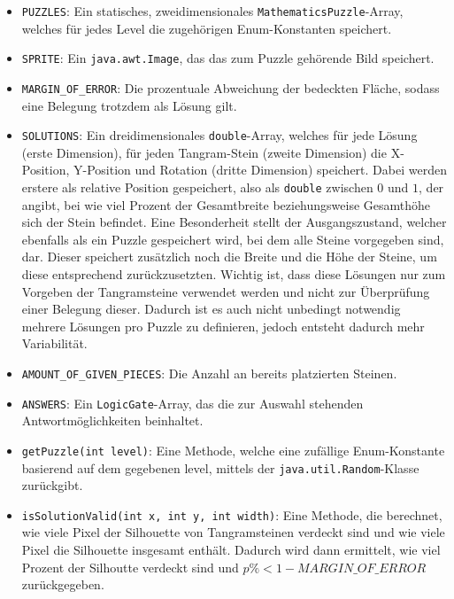 \begin{sloppypar}
    \begin{itemize}
        \item \texttt{PUZZLES}: Ein statisches, zweidimensionales \texttt{MathematicsPuzzle}-Array, welches für jedes Level die zugehörigen Enum-Konstanten speichert.
        \item \texttt{SPRITE}: Ein \texttt{java.awt.Image}, das das zum Puzzle gehörende Bild speichert.
        \item \texttt{MARGIN\_OF\_ERROR}: Die prozentuale Abweichung der bedeckten Fläche, sodass eine Belegung trotzdem als Lösung gilt.
        \item \texttt{SOLUTIONS}: Ein dreidimensionales \texttt{double}-Array, welches für jede Lösung (erste Dimension), für jeden Tangram-Stein (zweite Dimension) die X-Position, Y-Position und Rotation (dritte Dimension) speichert.
            Dabei werden erstere als relative Position gespeichert, also als \texttt{double} zwischen $0$ und $1$, der angibt, bei wie viel Prozent der Gesamtbreite beziehungsweise Gesamthöhe sich der Stein befindet.
            Eine Besonderheit stellt der Ausgangszustand, welcher ebenfalls als ein Puzzle gespeichert wird, bei dem alle Steine vorgegeben sind, dar.
            Dieser speichert zusätzlich noch die Breite und die Höhe der Steine, um diese entsprechend zurückzusetzten.
            Wichtig ist, dass diese Lösungen nur zum Vorgeben der Tangramsteine verwendet werden und nicht zur Überprüfung einer Belegung dieser.
            Dadurch ist es auch nicht unbedingt notwendig mehrere Lösungen pro Puzzle zu definieren, jedoch entsteht dadurch mehr Variabilität.
        \item \texttt{AMOUNT\_OF\_GIVEN\_PIECES}: Die Anzahl an bereits platzierten Steinen.
        \item \texttt{ANSWERS}: Ein \texttt{LogicGate}-Array, das die zur Auswahl stehenden Antwortmöglichkeiten beinhaltet.
        \item \texttt{getPuzzle(int level)}: Eine Methode, welche eine zufällige Enum-Konstante basierend auf dem gegebenen level, mittels der \texttt{java.util.Random}-Klasse zurückgibt.
        \item \texttt{isSolutionValid(int x, int y, int width)}: Eine Methode, die berechnet, wie viele Pixel der Silhouette von Tangramsteinen verdeckt sind und wie viele Pixel die Silhouette insgesamt enthält.
            Dadurch wird dann ermittelt, wie viel Prozent der Silhoutte verdeckt sind und $p\% < 1-MARGIN\_OF\_ERROR$ zurückgegeben.

\end{itemize}
\end{sloppypar}
